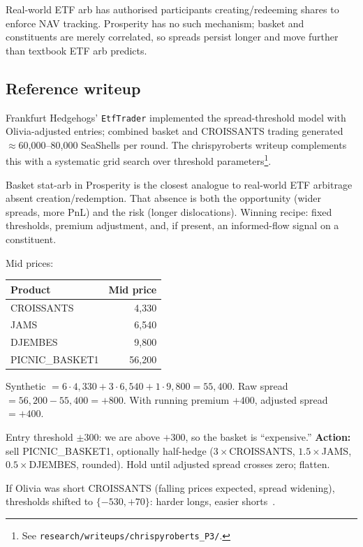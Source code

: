 \begin{pitfallbox}
Real-world ETF arb has authorised participants creating/redeeming
shares to enforce NAV tracking.  Prosperity has no such mechanism;
basket and constituents are merely correlated, so spreads persist
longer and move further than textbook ETF arb predicts.
\end{pitfallbox}

\subsection{Reference writeup}

Frankfurt Hedgehogs' \texttt{EtfTrader} implemented the
spread-threshold model with Olivia-adjusted entries; combined basket
and CROISSANTS trading generated $\approx$60{,}000--80{,}000
SeaShells per round.  The chrispyroberts writeup complements this
with a systematic grid search over threshold
parameters\footnote{See \texttt{research/writeups/chrispyroberts\_P3/}.}.

\begin{intuitionbox}
Basket stat-arb in Prosperity is the closest analogue to real-world
ETF arbitrage absent creation/redemption.  That absence is both the
opportunity (wider spreads, more PnL) and the risk (longer
dislocations).  Winning recipe: fixed thresholds, premium adjustment,
and, if present, an informed-flow signal on a constituent.
\end{intuitionbox}

\begin{prosperitybox}[title={PICNIC\_BASKET1 spread calculation}]
Mid prices:

\medskip
\begin{tabular}{lr}
\toprule
\textbf{Product} & \textbf{Mid price} \\
\midrule
CROISSANTS & 4{,}330 \\
JAMS       & 6{,}540 \\
DJEMBES    & 9{,}800 \\
PICNIC\_BASKET1 & 56{,}200 \\
\bottomrule
\end{tabular}
\medskip

Synthetic $= 6\cdot 4{,}330 + 3\cdot 6{,}540 + 1\cdot 9{,}800 =
55{,}400$.  Raw spread $= 56{,}200 - 55{,}400 = +800$.  With running
premium $+400$, adjusted spread $= +400$.

Entry threshold $\pm 300$: we are above $+300$, so the basket is
``expensive.''  \textbf{Action:} sell PICNIC\_BASKET1, optionally
half-hedge ($3\times$CROISSANTS, $1.5\times$JAMS, $0.5\times$DJEMBES,
rounded).  Hold until adjusted spread crosses zero; flatten.

If Olivia was short CROISSANTS (falling prices expected, spread
widening), thresholds shifted to $\{-530, +70\}$: harder longs,
easier shorts~\citep{frankfurthedgehogs2025}.
\end{prosperitybox}

